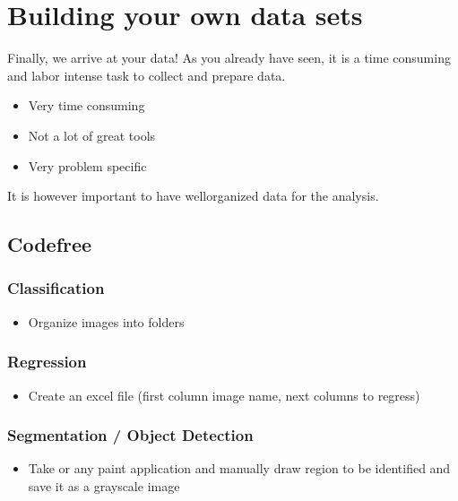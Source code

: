 \documentclass[letterpaper,10pt,english]{sphinxmanual}
\begin{document}
\chapter{Building your own data sets}
\label{\detokenize{03-Datasets:building-your-own-data-sets}}
\sphinxAtStartPar
Finally, we arrive at your data! As you already have seen, it is a time consuming and labor intense task to collect and prepare data.
\begin{itemize}
\item {} 
\sphinxAtStartPar
Very time consuming

\item {} 
\sphinxAtStartPar
Not a lot of great tools

\item {} 
\sphinxAtStartPar
Very problem specific

\end{itemize}

\sphinxAtStartPar
It is however important to have well\sphinxhyphen{}organized data for the analysis.


\section{Code\sphinxhyphen{}free}
\label{\detokenize{03-Datasets:code-free}}

\subsection{Classification}
\label{\detokenize{03-Datasets:id1}}\begin{itemize}
\item {} 
\sphinxAtStartPar
Organize images into folders

\end{itemize}


\subsection{Regression}
\label{\detokenize{03-Datasets:id2}}\begin{itemize}
\item {} 
\sphinxAtStartPar
Create an excel file (first column image name, next columns to regress)

\end{itemize}


\subsection{Segmentation / Object Detection}
\label{\detokenize{03-Datasets:segmentation-object-detection}}\begin{itemize}
\item {} 
\sphinxAtStartPar
Take  or any paint application and manually draw region to be identified and save it as a grayscale image

\end{itemize}
\end{document}
